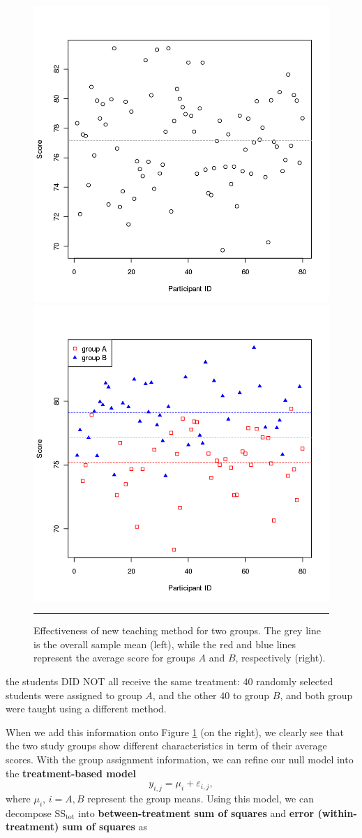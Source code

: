 \begin{figure}[t]
\centering
  \includegraphics[width=0.485\linewidth]{Images/testA1.png} \quad 
  \includegraphics[width=0.485\linewidth]{Images/testA2.png}
  \caption[\small Effectiveness of new teaching method (two groups)]{\small Effectiveness of new teaching method for two groups. The grey line is the overall sample mean (left), while the red and blue lines represent the average score for groups $A$ and $B$, respectively (right).}
  \label{fig:testA1} \hrule
\end{figure}
the students DID NOT all receive the same treatment: $40$ randomly selected students were assigned to group $A$, and the other $40$ to group $B$, and both group were taught using a different method. \par When we add this information onto Figure \ref{fig:testA1} (on the right), we clearly see that the two study groups show different characteristics in term of their average scores. \newpage\noindent With the group assignment information, we can refine our null model into the  \textbf{treatment-based model}
\begin{equation*}%
    y_{i,j}=\mu_{i}+\varepsilon_{i,j},
\end{equation*}
where $\mu_i$, $i={A,B}$ represent the group means. \newl Using this model, we can decompose $\text{SS}_{\textrm{tot}}$ into \textbf{between-treatment sum of squares} and \textbf{error (within-treatment) sum of squares} as
